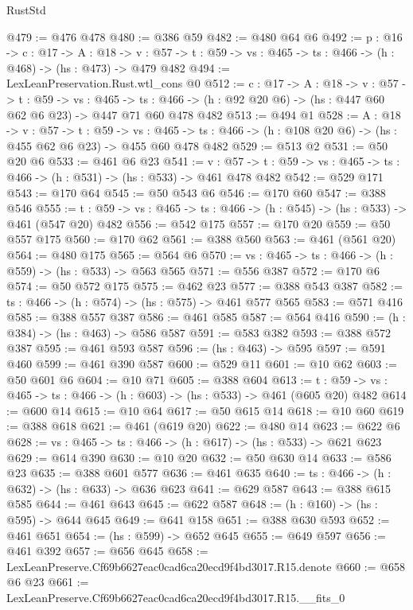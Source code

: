 \begin{lexlean}{RustStd}
\begin{coremodule}
@479 := @476 @478
@480 := @386 @59
@482 := @480 @64 @6
@492 := {p : @16} ->
  {c : @17} ->
  {A : @18} ->
  {v : @57} -> {t : @59} -> {vs : @465} -> {ts : @466} -> (h : @468) -> (hs : @473) -> @479 @482
@494 := LexLeanPreservation.Rust.wtl_cons @0
@512 := {c : @17} ->
  {A : @18} ->
  {v : @57} ->
  {t : @59} ->
  {vs : @465} ->
  {ts : @466} -> (h : @92 @20 @6) -> (hs : @447 @60 @62 @6 @23) -> @447 @71 @60 @478 @482
@513 := @494 @1
@528 := {A : @18} ->
  {v : @57} ->
  {t : @59} ->
  {vs : @465} -> {ts : @466} -> (h : @108 @20 @6) -> (hs : @455 @62 @6 @23) -> @455 @60 @478 @482
@529 := @513 @2
@531 := @50 @20 @6
@533 := @461 @6 @23
@541 := {v : @57} ->
  {t : @59} -> {vs : @465} -> {ts : @466} -> (h : @531) -> (hs : @533) -> @461 @478 @482
@542 := @529 @171
@543 := @170 @64
@545 := @50 @543 @6
@546 := @170 @60
@547 := @388 @546
@555 := {t : @59} -> {vs : @465} -> {ts : @466} -> (h : @545) -> (hs : @533) -> @461 (@547 @20) @482
@556 := @542 @175
@557 := @170 @20
@559 := @50 @557 @175
@560 := @170 @62
@561 := @388 @560
@563 := @461 (@561 @20)
@564 := @480 @175
@565 := @564 @6
@570 := {vs : @465} -> {ts : @466} -> (h : @559) -> (hs : @533) -> @563 @565
@571 := @556 @387
@572 := @170 @6
@574 := @50 @572 @175
@575 := @462 @23
@577 := @388 @543 @387
@582 := {ts : @466} -> (h : @574) -> (hs : @575) -> @461 @577 @565
@583 := @571 @416
@585 := @388 @557 @387
@586 := @461 @585
@587 := @564 @416
@590 := (h : @384) -> (hs : @463) -> @586 @587
@591 := @583 @382
@593 := @388 @572 @387
@595 := @461 @593 @587
@596 := (hs : @463) -> @595
@597 := @591 @460
@599 := @461 @390 @587
@600 := @529 @11
@601 := @10 @62
@603 := @50 @601 @6
@604 := @10 @71
@605 := @388 @604
@613 := {t : @59} -> {vs : @465} -> {ts : @466} -> (h : @603) -> (hs : @533) -> @461 (@605 @20) @482
@614 := @600 @14
@615 := @10 @64
@617 := @50 @615 @14
@618 := @10 @60
@619 := @388 @618
@621 := @461 (@619 @20)
@622 := @480 @14
@623 := @622 @6
@628 := {vs : @465} -> {ts : @466} -> (h : @617) -> (hs : @533) -> @621 @623
@629 := @614 @390
@630 := @10 @20
@632 := @50 @630 @14
@633 := @586 @23
@635 := @388 @601 @577
@636 := @461 @635
@640 := {ts : @466} -> (h : @632) -> (hs : @633) -> @636 @623
@641 := @629 @587
@643 := @388 @615 @585
@644 := @461 @643
@645 := @622 @587
@648 := (h : @160) -> (hs : @595) -> @644 @645
@649 := @641 @158
@651 := @388 @630 @593
@652 := @461 @651
@654 := (hs : @599) -> @652 @645
@655 := @649 @597
@656 := @461 @392
@657 := @656 @645
@658 := LexLeanPreserve.Cf69b6627eac0cad6ca20ecd9f4bd3017.R15.denote
@660 := @658 @6 @23
@661 := LexLeanPreserve.Cf69b6627eac0cad6ca20ecd9f4bd3017.R15.__fits_0

\end{coremodule}
\end{lexlean}
